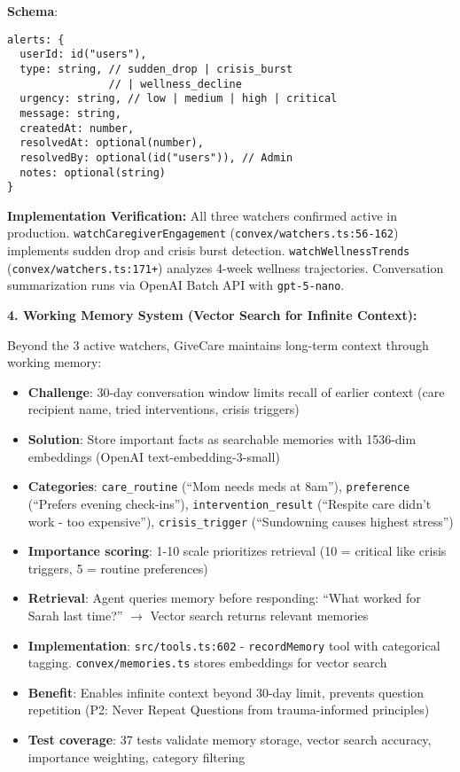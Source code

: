 \documentclass{article}
\begin{document}
\textbf{Schema}:
\begin{verbatim}
alerts: {
  userId: id("users"),
  type: string, // sudden_drop | crisis_burst
                // | wellness_decline
  urgency: string, // low | medium | high | critical
  message: string,
  createdAt: number,
  resolvedAt: optional(number),
  resolvedBy: optional(id("users")), // Admin
  notes: optional(string)
}
\end{verbatim}

\textbf{Implementation Verification:} All three watchers confirmed active in production. \texttt{watchCaregiverEngagement} (\texttt{convex/watchers.ts:56-162}) implements sudden drop and crisis burst detection. \texttt{watchWellnessTrends} (\texttt{convex/watchers.ts:171+}) analyzes 4-week wellness trajectories. Conversation summarization runs via OpenAI Batch API with \texttt{gpt-5-nano}.

\textbf{4. Working Memory System (Vector Search for Infinite Context):}

Beyond the 3 active watchers, GiveCare maintains long-term context through working memory:

\begin{itemize}
    \item \textbf{Challenge}: 30-day conversation window limits recall of earlier context (care recipient name, tried interventions, crisis triggers)
    \item \textbf{Solution}: Store important facts as searchable memories with 1536-dim embeddings (OpenAI text-embedding-3-small)
    \item \textbf{Categories}: \texttt{care\_routine} (``Mom needs meds at 8am''), \texttt{preference} (``Prefers evening check-ins''), \texttt{intervention\_result} (``Respite care didn't work - too expensive''), \texttt{crisis\_trigger} (``Sundowning causes highest stress'')
    \item \textbf{Importance scoring}: 1-10 scale prioritizes retrieval (10 = critical like crisis triggers, 5 = routine preferences)
    \item \textbf{Retrieval}: Agent queries memory before responding: ``What worked for Sarah last time?'' $\rightarrow$ Vector search returns relevant memories
    \item \textbf{Implementation}: \texttt{src/tools.ts:602} - \texttt{recordMemory} tool with categorical tagging. \texttt{convex/memories.ts} stores embeddings for vector search
    \item \textbf{Benefit}: Enables infinite context beyond 30-day limit, prevents question repetition (P2: Never Repeat Questions from trauma-informed principles)
    \item \textbf{Test coverage}: 37 tests validate memory storage, vector search accuracy, importance weighting, category filtering
\end{itemize}
\end{document}
